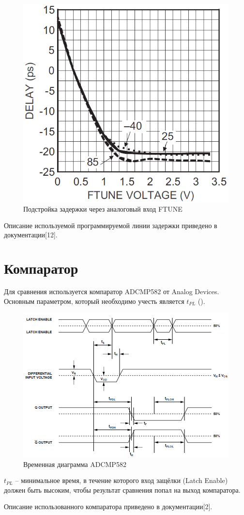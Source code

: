 \begin{figure}[ht!] 
	\center
	\includegraphics [scale=0.6] {my_folder/images//dline_ftune}
	\caption{Подстройка задержки через аналоговый вход FTUNE} 
	\label{fig:dline-ftune}  
\end{figure}

\FloatBarrier

Описание используемой программируемой линии задержки приведено в документации[12].

\section{Компаратор}

Для сравнения используется компаратор ADCMP582 от Analog Devices.
Основным параметром, который необходимо учесть является $ t_{PL} $ ().

\begin{figure}[ht!] 
	\center
	\includegraphics [scale=0.7] {my_folder/images//cmp_wave}
	\caption{Временная диаграмма ADCMP582} 
	\label{fig:cmp-wave}  
\end{figure}
\FloatBarrier

$ t_{PL} $ -- минимальное время, в течение которого вход защёлки (Latch Enable) должен быть высоким, чтобы результат сравнения попал на выход компаратора.

Описание использованного компаратора приведено в документации[2].
\newpage